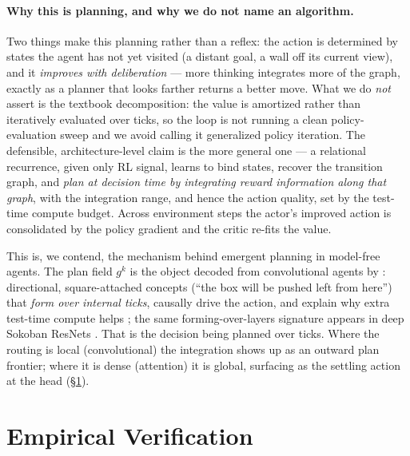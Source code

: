 \documentclass{article} %
\theoremstyle{plain}
\theoremstyle{definition}
\begin{document}
\paragraph{Why this is planning, and why we do not name an algorithm.} Two things
make this planning rather than a reflex: the action is determined by states the
agent has not yet visited (a distant goal, a wall off its current view), and it
\emph{improves with deliberation} --- more thinking integrates more of the graph,
exactly as a planner that looks farther returns a better move. What we do
\emph{not} assert is the textbook decomposition: the value is amortized rather than
iteratively evaluated over ticks, so the loop is not running a clean
policy-evaluation sweep and we avoid calling it generalized policy iteration. The
defensible, architecture-level claim is the more general one --- a relational
recurrence, given only RL signal, learns to bind states, recover the transition
graph, and \emph{plan at decision time by integrating reward information along that
graph}, with the integration range, and hence the action quality, set by the
test-time compute budget. Across environment steps the actor's improved action is
consolidated by the policy gradient and the critic re-fits the value.

This is, we contend, the mechanism behind emergent planning in model-free agents.
The plan field $g^{k}$ is the object decoded from convolutional agents by
\citet{bush2025interpreting}: directional, square-attached concepts (``the box will
be pushed left from here'') that \emph{form over internal ticks}, causally drive the
action, and explain why extra test-time compute helps \citep{guez2019investigation};
the same forming-over-layers signature appears in deep Sokoban ResNets
\citep{taufeeque2024planning}. That is the decision being planned over ticks. Where
the routing is local (convolutional) the integration shows up as an outward plan
frontier; where it is dense (attention) it is global, surfacing as the settling
action at the head (\S\ref{sec:empirics}).

\section{Empirical Verification}
\label{sec:empirics}
\end{document}
